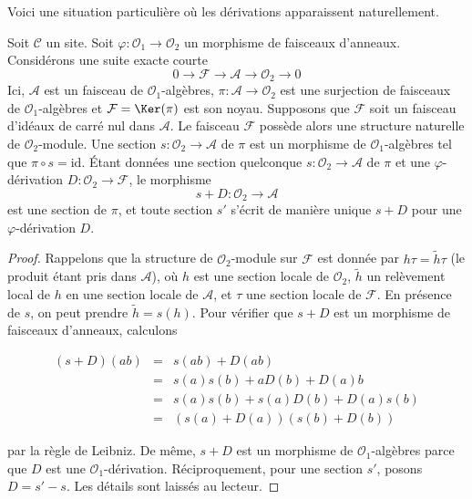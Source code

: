 \noindent
Voici une situation particulière où les dérivations apparaissent naturellement.

\begin{lemma}

\label{lemma-double-structure-gives-derivation}

Soit $\mathcal{C}$ un site. Soit
$\varphi : \mathcal{O}_1 \to \mathcal{O}_2$ un morphisme de faisceaux
d'anneaux. Considérons une suite exacte courte
$$
0 \to \mathcal{F} \to \mathcal{A} \to \mathcal{O}_2 \to 0
$$
Ici, $\mathcal{A}$ est un faisceau de $\mathcal{O}_1$-algèbres,
$\pi : \mathcal{A} \to \mathcal{O}_2$ est une surjection de faisceaux de
$\mathcal{O}_1$-algèbres et $\mathcal{F} = \Ker(\pi)$ est son noyau.
Supposons que $\mathcal{F}$ soit un faisceau d'idéaux de carré nul dans
$\mathcal{A}$. Le faisceau $\mathcal{F}$ possède alors une structure naturelle de
$\mathcal{O}_2$-module. Une section $s : \mathcal{O}_2 \to \mathcal{A}$ de
$\pi$ est un morphisme de $\mathcal{O}_1$-algèbres tel que
$\pi \circ s = \text{id}$. Étant données une section quelconque
$s : \mathcal{O}_2 \to \mathcal{A}$ de $\pi$ et une $\varphi$-dérivation
$D : \mathcal{O}_2 \to \mathcal{F}$, le morphisme
$$
s + D : \mathcal{O}_2 \to \mathcal{A}
$$
est une section de $\pi$, et toute section $s'$ s'écrit de manière unique
$s + D$ pour une $\varphi$-dérivation $D$.

\end{lemma}

\begin{proof}

Rappelons que la structure de $\mathcal{O}_2$-module sur $\mathcal{F}$ est
donnée par $h \tau = \tilde h \tau$ (le produit étant pris dans
$\mathcal{A}$), où $h$ est une section locale de $\mathcal{O}_2$,
$\tilde h$ un relèvement local de $h$ en une section locale de $\mathcal{A}$,
et $\tau$ une section locale de $\mathcal{F}$. En présence de $s$, on peut
prendre $\tilde h = s(h)$. Pour vérifier que $s + D$ est un morphisme de
faisceaux d'anneaux, calculons

\begin{eqnarray*}
(s + D)(ab) & = & s(ab) + D(ab) \\
& = & s(a)s(b) + aD(b) + D(a)b \\
& = & s(a) s(b) + s(a)D(b) + D(a)s(b) \\
& = & (s(a) + D(a))(s(b) + D(b))
\end{eqnarray*}

par la règle de Leibniz. De même, $s + D$ est un morphisme de
$\mathcal{O}_1$-algèbres parce que $D$ est une $\mathcal{O}_1$-dérivation.
Réciproquement, pour une section $s'$, posons $D = s' - s$. Les détails sont
laissés au lecteur.

\end{proof}

